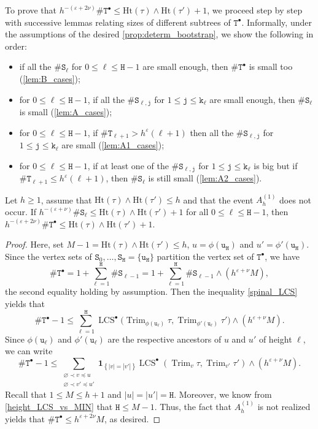\documentclass[11pt,reqno]{amsart}
\newcommand{\1}{\mathbf{1}}
\newcommand{\0}{\mathbf{0}}
\newcommand{\ttS}{\mathtt{S}}
\newcommand{\ttT}{\mathtt{T}}
\newcommand{\ttH}{\mathtt{H}}
\newcommand{\ttj}{\mathtt{j}}
\newcommand{\ttk}{\mathtt{k}}
\newcommand{\ttu}{\mathtt{u}}
\newcommand{\I}[1]{{\mathbf 1}_{\left\{#1\right\}}}
\newcommand{\Ht}{\mathrm{Ht}}
\newcommand{\Trim}{\operatorname{Trim}}
\newcommand{\LCS}{\operatorname{LCS}}
\newcommand{\eps}{\varepsilon}
\begin{document}
To prove that $h^{-(\eps+2\nu)}\#\ttT^\bullet \leq \Ht(\tau)\wedge\Ht(\tau')+1$, we proceed step by step with successive lemmas relating sizes of different subtrees of $\ttT^\bullet$. Informally, under the assumptions of the desired \cref{prop:determ_bootstrap}, we show the following in order: 
\begin{itemize}
    \item if all the $\#\ttS_\ell$ for $0\leq \ell\leq \ttH-1$ are small enough, then $\#\ttT^\bullet$ is small too (\cref{lem:B_cases});
    \item for $0\leq \ell\leq \ttH-1$, if all the $\# \ttS_{\ell,\ttj}$ for $1\leq \ttj\leq \ttk_\ell$ are small enough, then $\#\ttS_{\ell}$ is small (\cref{lem:A_cases});
    \item for $0\leq \ell \leq \ttH-1$, if $\#\ttT_{\ell+1}>h^\varepsilon (\ell+1)$ then all the $\# \ttS_{\ell,\ttj}$ for $1\leq \ttj\leq \ttk_\ell$ are small (\cref{lem:A1_cases});
    \item for $0\leq \ell\leq \ttH-1$, if at least one of the $\# \ttS_{\ell,\ttj}$ for $1\leq \ttj\leq \ttk_\ell$ is big but if $\#\ttT_{\ell+1}\leq h^\varepsilon(\ell+1)$, then $\#\ttS_{\ell}$ is still small (\cref{lem:A2_cases}).
\end{itemize}


\begin{lem}
\label{lem:B_cases}
Let $h\geq 1$, assume that $\Ht(\tau)\wedge\Ht(\tau')\leq h$ and that the event $A_h^{(1)}$ does not occur. If $h^{-(\varepsilon+\nu)}\# \ttS_\ell\leq \Ht(\tau)\wedge\Ht(\tau')+1$ for all $0\leq \ell\leq \ttH-1$, then $h^{-(\eps+2\nu)}\#\ttT^\bullet\leq  \Ht(\tau)\wedge\Ht(\tau')+1$.
\end{lem}

\begin{proof}
Here, set $M-1=\Ht(\tau)\wedge\Ht(\tau')\leq h$, $u=\phi(\ttu_{\ttH})$ and $u'=\phi'(\ttu_{\ttH})$. Since the vertex sets of $\ttS_0,\ldots,\ttS_{\ttH}=\{\ttu_{\ttH}\}$ partition the vertex set of $\ttT^\bullet$, we have 
\[\#\ttT^\bullet=1+\sum_{\ell=1}^{\ttH}\#\ttS_{\ell-1}=1+\sum_{\ell=1}^{\ttH}\#\ttS_{\ell-1}\wedge (h^{\varepsilon+\nu} M),\]
the second equality holding by assumption.
Then the inequality \eqref{spinal_LCS} yields that
\[\#\ttT^\bullet-1\leq \sum_{\ell=1}^{\ttH}\LCS^\bullet\big(\Trim_{\phi(\ttu_\ell)}\tau,\Trim_{\phi'(\ttu_\ell)}\tau'\big)\wedge (h^{\varepsilon+\nu} M).\]
Since $\phi(\ttu_\ell)$ and $\phi'(\ttu_\ell)$ are the respective ancestors of $u$ and $u'$ of height $\ell$, we can write 
\[\#\ttT^\bullet -1\leq \sum_{\substack{\varnothing\prec v\preceq u\\ \varnothing\prec v'\preceq u'}}\I{|v|=|v'|}\LCS^\bullet(\Trim_v\tau,\Trim_{v'}\tau')\wedge (h^{\varepsilon+\nu} M).\]
Recall that $1\leq M\leq h+1$ and $|u|=|u'|=\ttH$. Moreover, we know from \eqref{height_LCS_vs_MIN} that $\ttH\leq M-1$. Thus, the fact that $A_h^{(1)}$ is not realized yields that $\#\ttT^\bullet\leq h^{\eps+2\nu} M$, as desired.
\end{proof}
\end{document}
